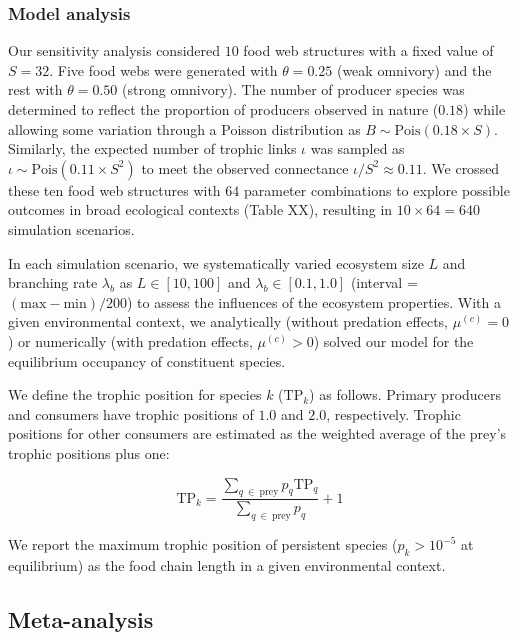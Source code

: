 \documentclass[11pt, class=article, crop=false]{standalone}
\begin{document}
\subsubsection{Model analysis}

Our sensitivity analysis considered $10$ food web structures with a fixed value of $S = 32$.
Five food webs were generated with $\theta = 0.25$ (weak omnivory) and the rest with $\theta = 0.50$ (strong omnivory).
The number of producer species was determined to reflect the proportion of producers observed in nature ($0.18$) while allowing some variation through a Poisson distribution as $B \sim \mbox{Pois}(0.18 \times S)$.
Similarly, the expected number of trophic links $\iota$ was sampled as $\iota \sim \mbox{Pois}(0.11 \times S^2)$ to meet the observed connectance $\iota / S^2 \approx 0.11$.
We crossed these ten food web structures with $64$ parameter combinations to explore possible outcomes in broad ecological contexts (Table XX), resulting in $10 \times 64 = 640$ simulation scenarios.

In each simulation scenario, we systematically varied ecosystem size $L$ and branching rate $\lambda_b$ as $L \in [10, 100]$ and $\lambda_b \in [0.1, 1.0]$ (interval = $(\text{max} - \text{min}) / 200$) to assess the influences of the ecosystem properties.
With a given environmental context, we analytically (without predation effects, $\mu^{(c)} = 0$) or numerically (with predation effects, $\mu^{(c)} > 0$)  solved our model for the equilibrium occupancy of constituent species.

We define the trophic position for species $k$ ($\text{TP}_k$) as follows.
Primary producers and consumers have trophic positions of $1.0$ and $2.0$, respectively.
Trophic positions for other consumers are estimated as the weighted average of the prey's trophic positions plus one:

\begin{equation}
    \mbox{TP}_k = \frac{\sum_{q~\in~\text{prey}} p_{q} \mbox{TP}_q}{\sum_{q~\in~\text{prey}} p_{q}} + 1
\end{equation}

We report the maximum trophic position of persistent species ($p_k > 10^{-5}$ at equilibrium) as the food chain length in a given environmental context.

\subsection{Meta-analysis}
\end{document}
